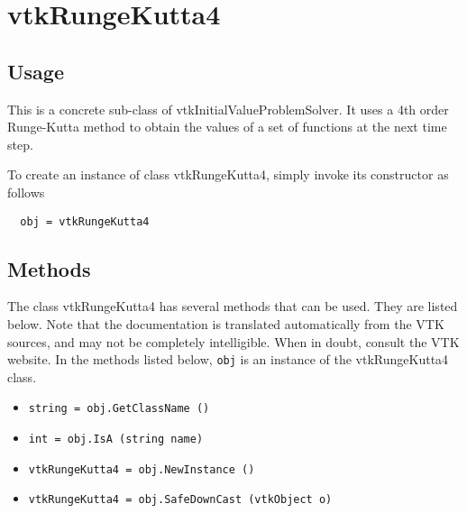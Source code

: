 \section{vtkRungeKutta4}

\subsection{Usage}

 This is a concrete sub-class of vtkInitialValueProblemSolver.
 It uses a 4th order Runge-Kutta method to obtain the values of
 a set of functions at the next time step.

To create an instance of class vtkRungeKutta4, simply
invoke its constructor as follows
\begin{verbatim}
  obj = vtkRungeKutta4
\end{verbatim}
\subsection{Methods}

The class vtkRungeKutta4 has several methods that can be used.
  They are listed below.
Note that the documentation is translated automatically from the VTK sources,
and may not be completely intelligible.  When in doubt, consult the VTK website.
In the methods listed below, \verb|obj| is an instance of the vtkRungeKutta4 class.
\begin{itemize}
\item  \verb|string = obj.GetClassName ()|

\item  \verb|int = obj.IsA (string name)|

\item  \verb|vtkRungeKutta4 = obj.NewInstance ()|

\item  \verb|vtkRungeKutta4 = obj.SafeDownCast (vtkObject o)|

\end{itemize}
